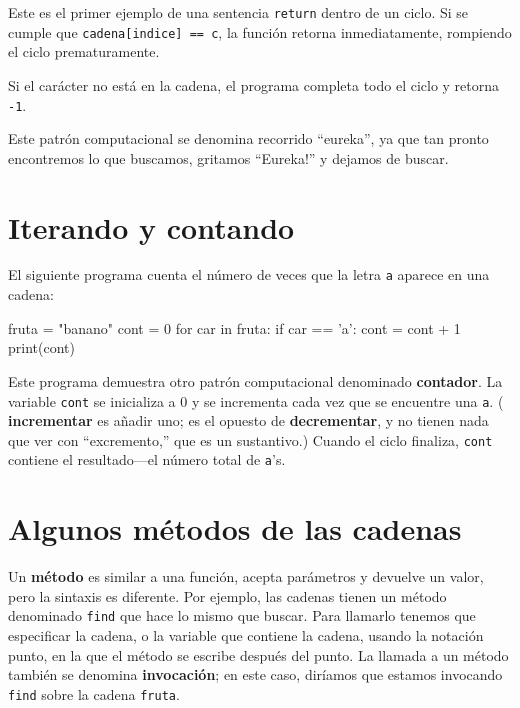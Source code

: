 Este es el primer ejemplo de una sentencia \texttt{return} dentro
de un ciclo. Si se cumple que \texttt{cadena{[}indice{]} == c}, la
función retorna inmediatamente, rompiendo el ciclo prematuramente.

Si el carácter no está en la cadena, el programa completa todo el
ciclo y retorna \texttt{-1}.

Este patrón computacional se denomina recorrido ``eureka'', ya que
tan pronto encontremos lo que buscamos, gritamos ``Eureka!'' y dejamos
de buscar.

\section{Iterando y contando}

\label{counter}  

El siguiente programa cuenta el número de veces que la letra \texttt{a}
aparece en una cadena:
\begin{pythoncode}
fruta = "banano"
cont = 0
for car in fruta:
  if car == 'a':
    cont = cont + 1
print(cont)
\end{pythoncode}
 Este programa demuestra otro patrón computacional denominado \textbf{contador}.
La variable \texttt{cont} se inicializa a 0 y se incrementa cada vez
que se encuentre una \texttt{a}. ( \textbf{incrementar} es añadir
uno; es el opuesto de \textbf{decrementar}, y no tienen nada que ver
con ``excremento,'' que es un sustantivo.) Cuando el ciclo finaliza,
\texttt{cont} contiene el resultado—el número total de \texttt{a}'s.

\section{Algunos métodos de las cadenas}

  
  

Un \textbf{método} es similar a una función, acepta parámetros y devuelve
un valor, pero la sintaxis es diferente. Por ejemplo, las cadenas
tienen un método denominado \texttt{find} que hace lo mismo que buscar.
Para llamarlo tenemos que especificar la cadena, o la variable que
contiene la cadena, usando la notación punto, en la que el método
se escribe después del punto. La llamada a un método también se denomina
\textbf{invocación}; en este caso, diríamos que estamos invocando
\texttt{find} sobre la cadena \texttt{fruta}.

